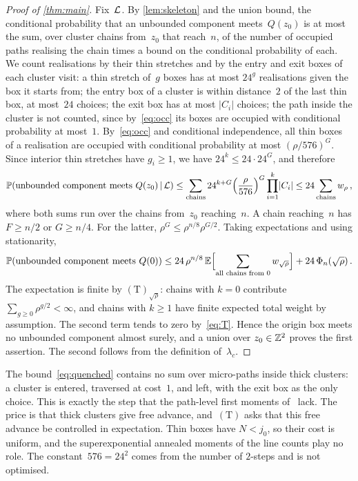 \documentclass[11pt,letterpaper]{article}
\begin{document}
\begin{proof}[Proof of \cref{thm:main}]
Fix~$\mathcal L$. By \cref{lem:skeleton} and the union bound, the conditional probability that an unbounded component meets~$Q(z_0)$ is at most the sum, over cluster chains from~$z_0$ that reach~$n$, of the number of occupied paths realising the chain times a bound on the conditional probability of each. We count realisations by their thin stretches and by the entry and exit boxes of each cluster visit: a thin stretch of~$g$ boxes has at most $24^{g}$ realisations given the box it starts from; the entry box of a cluster is within distance~$2$ of the last thin box, at most~$24$ choices; the exit box has at most $\lvert C_i\rvert$ choices; the path inside the cluster is not counted, since by~\eqref{eq:occ} its boxes are occupied with conditional probability at most~$1$. By~\eqref{eq:occ} and conditional independence, all thin boxes of a realisation are occupied with conditional probability at most $(\rho/576)^{G}$. Since interior thin stretches have $g_i\ge1$, we have $24^k\le24\cdot24^{G}$, and therefore
\begin{equation}
\label{eq:quenched}
  \mathbb P(\text{unbounded component meets }Q(z_0)\,\vert\,\mathcal L)\le\sum_{\text{chains}}24^{k+G}\Bigl(\frac{\rho}{576}\Bigr)^{G}\prod_{i=1}^k\lvert C_i\rvert\le24\sum_{\text{chains}}w_\rho\,,
\end{equation}
where both sums run over the chains from~$z_0$ reaching~$n$. A chain reaching~$n$ has $F\ge n/2$ or $G\ge n/4$. For the latter, $\rho^{G}\le\rho^{n/8}\rho^{G/2}$. Taking expectations and using stationarity,
\begin{equation*}
  \mathbb P(\text{unbounded component meets }Q(0))\le24\,\rho^{n/8}\,\mathbb E\Bigl[\sum_{\text{all chains from }0}w_{\sqrt\rho}\Bigr]+24\,\Phi_n(\sqrt\rho)\,.
\end{equation*}
The expectation is finite by $\mathrm{(T)}_{\sqrt\rho}$: chains with $k=0$ contribute $\sum_{g\ge0}\rho^{g/2}<\infty$, and chains with $k\ge1$ have finite expected total weight by assumption. The second term tends to zero by~\eqref{eq:T}. Hence the origin box meets no unbounded component almost surely, and a union over $z_0\in\mathbb Z^2$ proves the first assertion. The second follows from the definition of~$\lambda_c$.
\end{proof}

\begin{remark}
\label{rem:skeleton}
The bound~\eqref{eq:quenched} contains no sum over micro-paths inside thick clusters: a cluster is entered, traversed at cost~$1$, and left, with the exit box as the only choice. This is exactly the step that the path-level first moments of~\cite[Section~2]{GA26} lack. The price is that thick clusters give free advance, and~$\mathrm{(T)}$ asks that this free advance be controlled in expectation. Thin boxes have $N<j_0$, so their cost is uniform, and the superexponential annealed moments of the line counts play no role. The constant~$576=24^2$ comes from the number of $2$-steps and is not optimised.
\end{remark}
\end{document}
